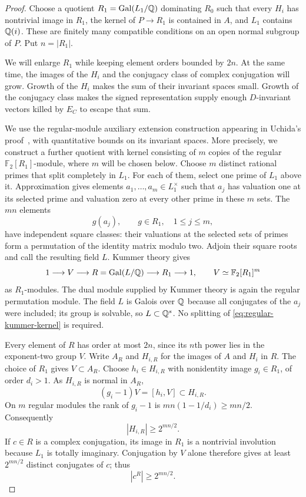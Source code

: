\begin{proof}
Choose a quotient $R_1=\operatorname{Gal}(L_1/\mathbb Q)$ dominating $R_0$ such that
every $H_i$ has nontrivial image in $R_1$, the kernel of $P\to R_1$
is contained in $A$, and $L_1$ contains $\mathbb Q(i)$. These are finitely
many compatible conditions on an open normal subgroup of $P$.
Put $n=|R_1|$.

We will enlarge $R_1$ while keeping element orders bounded by $2n$.
At the same time, the images of the $H_i$ and the conjugacy class of
complex conjugation will grow. Growth of the $H_i$ makes the sum
of their invariant spaces small. Growth of the conjugacy class
makes the signed representation supply enough $D$-invariant
vectors killed by $E_C$ to escape that sum.

We use the regular-module auxiliary extension construction appearing
in Uchida's proof~\cite[pp.~360--362]{uchida1979}, with quantitative
bounds on its invariant spaces. More precisely, we construct a
further quotient with kernel consisting of $m$ copies of the regular
$\mathbb F_2[R_1]$-module, where $m$ will be chosen below.
Choose $m$ distinct rational primes that split completely in $L_1$.
For each of them, select one prime of $L_1$ above it. Approximation
gives elements $a_1,\ldots,a_m\in L_1^\times$ such that $a_j$ has
valuation one at its selected prime and valuation zero at every other
prime in these $m$ sets. The $mn$ elements
\[
  g(a_j),\qquad g\in R_1,\quad 1\leq j\leq m,
\]
have independent square classes: their valuations at the selected
sets of primes form a permutation of the identity matrix modulo two.
Adjoin their square roots and call the resulting field $L$.
Kummer theory gives
\begin{equation}\label{eq:regular-kummer-kernel}
  1\longrightarrow V\longrightarrow R=\operatorname{Gal}(L/\mathbb Q)
   \longrightarrow R_1\longrightarrow1,
  \qquad V\simeq\mathbb F_2[R_1]^m
\end{equation}
as $R_1$-modules. The dual module supplied by Kummer theory is again
the regular permutation module. The field $L$ is Galois over $\mathbb Q$
because all conjugates of the $a_j$ were included; its group is
solvable, so $L\subset\mathbb Q^s$. No splitting of
\eqref{eq:regular-kummer-kernel} is required.

Every element of $R$ has order at most $2n$, since its $n$th power
lies in the exponent-two group $V$. Write $A_R$ and $H_{i,R}$ for
the images of $A$ and $H_i$ in $R$. The choice of $R_1$ gives
$V\subset A_R$. Choose $h_i\in H_{i,R}$ with nonidentity image
$g_i\in R_1$, of order $d_i>1$. As $H_{i,R}$ is normal in $A_R$,
\[
 (g_i-1)V=[h_i,V]\subset H_{i,R}.
\]
On $m$ regular modules the rank of $g_i-1$ is
$mn(1-1/d_i)\geq mn/2$. Consequently
\begin{equation}\label{eq:large-subgroups}
  |H_{i,R}|\geq 2^{mn/2}.
\end{equation}
If $c\in R$ is a complex conjugation, its image in $R_1$ is a
nontrivial involution because $L_1$ is totally imaginary.
Conjugation by $V$ alone therefore gives at least $2^{mn/2}$ distinct
conjugates of $c$; thus
\begin{equation}\label{eq:large-conjugacy-class}
  |c^R|\geq 2^{mn/2}.
\end{equation}


\end{proof}
